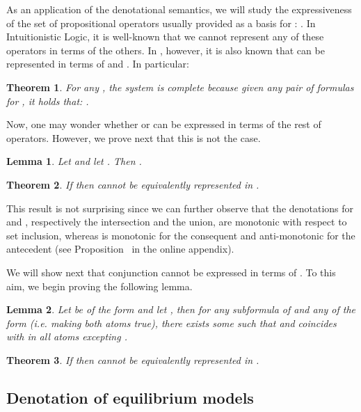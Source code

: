 \documentclass{tlp}
\def\qed{~\hfill}
\newtheorem{theorem}{Theorem}
\newtheorem{lemma}{Lemma}
\begin{document}
As an application of the denotational semantics, we will study the expressiveness of the set of propositional operators usually provided as a basis for : . In Intuitionistic Logic, it is well-known that we cannot represent any of these operators in terms of the others. In , however, it is also known 
that  can be represented in terms of  and . In particular:

\begin{theorem}\label{th:or} 
For any , the system  is complete because given any pair of formulas  for , it holds that:
. \qed
\end{theorem}

Now, one may wonder whether  or  can be expressed in terms of the rest of operators. However, we prove next that this is not the case.

\begin{lemma}\label{lem:imply} 
Let  and let . Then . \qed
\end{lemma}

\begin{theorem}\label{th:imp} 
If  then  cannot be equivalently represented in .\qed
\end{theorem}

\noindent This result is not surprising since we can further observe that the denotations for  and , respectively the intersection and the union, are monotonic with respect to set inclusion, whereas  is monotonic for the consequent and anti-monotonic for the antecedent (see Proposition~ in the online appendix).

We will show next that conjunction cannot be expressed in terms of . To this aim, we begin proving the following lemma.

\begin{lemma}\label{lem:pq} 
Let  be of the form  and let , then for any subformula  of  and any  of the form  (i.e. making both atoms true), there exists some  such that  and  coincides with  in all atoms excepting .\qed
\end{lemma}

\begin{theorem}\label{th:wedge} 
If  then  cannot be equivalently represented in .\qed
\end{theorem}

\subsection{Denotation of equilibrium models}
\end{document}
